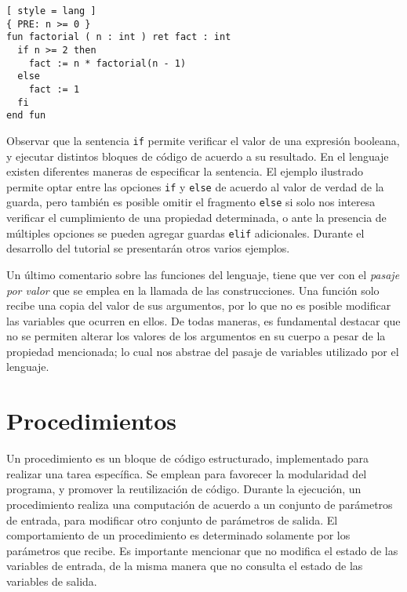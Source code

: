 \begin{lstlisting}[ style = lang ]
{ PRE: n >= 0 }
fun factorial ( n : int ) ret fact : int
  if n >= 2 then
    fact := n * factorial(n - 1)
  else
    fact := 1
  fi
end fun
\end{lstlisting}

Observar que la sentencia \lstinline[style = lang]{if} permite verificar el valor de una expresión booleana, y ejecutar distintos bloques de código de acuerdo a su resultado.
En el lenguaje existen diferentes maneras de especificar la sentencia.
El ejemplo ilustrado permite optar entre las opciones \lstinline[style = lang]{if} y \lstinline[style = lang]{else} de acuerdo al valor de verdad de la guarda, pero también es posible omitir el fragmento \lstinline[style = lang]{else} si solo nos interesa verificar el cumplimiento de una propiedad determinada, o ante la presencia de múltiples opciones se pueden agregar guardas \lstinline[style = lang]{elif} adicionales.
Durante el desarrollo del tutorial se presentarán otros varios ejemplos.

Un último comentario sobre las funciones del lenguaje, tiene que ver con el \textit{pasaje por valor} que se emplea en la llamada de las construcciones.
Una función solo recibe una copia del valor de sus argumentos, por lo que no es posible modificar las variables que ocurren en ellos.
De todas maneras, es fundamental destacar que no se permiten alterar los valores de los argumentos en su cuerpo a pesar de la propiedad mencionada; lo cual nos abstrae del pasaje de variables utilizado por el lenguaje.



\section{Procedimientos}

Un procedimiento es un bloque de código estructurado, implementado para realizar una tarea específica.
Se emplean para favorecer la modularidad del programa, y promover la reutilización de código.
Durante la ejecución, un procedimiento realiza una computación de acuerdo a un conjunto de parámetros de entrada, para modificar otro conjunto de parámetros de salida.
El comportamiento de un procedimiento es determinado solamente por los parámetros que recibe.
Es importante mencionar que no modifica el estado de las variables de entrada, de la misma manera que no consulta el estado de las variables de salida.

